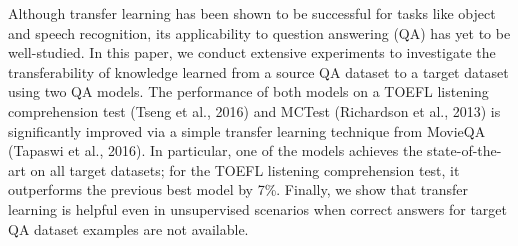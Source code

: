 Although transfer learning has been shown to be successful for tasks like object and speech recognition, its applicability to question answering (QA) has yet to be well-studied. In this paper, we conduct extensive experiments to investigate the transferability of knowledge learned from a source QA dataset to a target dataset using two QA models. The performance of both models on a TOEFL listening comprehension test (Tseng et al., 2016) and MCTest (Richardson et al., 2013) is significantly improved via a simple transfer learning technique from MovieQA (Tapaswi et al., 2016). In particular, one of the models achieves the state-of-the-art on all target datasets; for the TOEFL listening comprehension test, it outperforms the previous best model by 7\%. Finally, we show that transfer learning is helpful even in unsupervised scenarios when correct answers for target QA dataset examples are not available.
